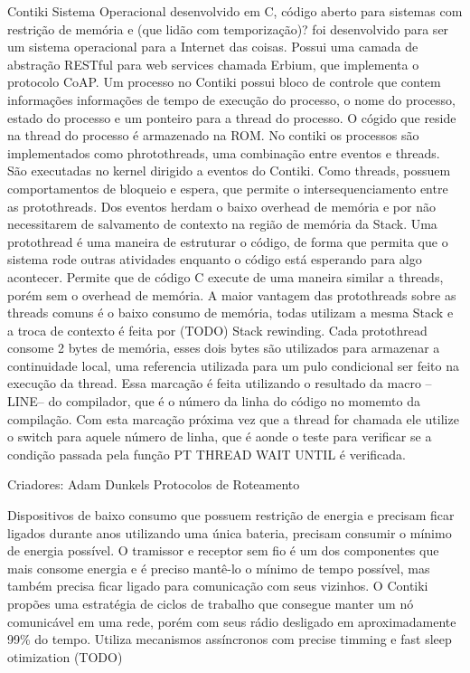 Contiki Sistema Operacional desenvolvido em C, c\'odigo aberto para sistemas com restri\c{c}\~ao de mem\'oria e (que lid\~ao com temporiza\c{c}\~ao)? foi desenvolvido para ser um sistema operacional para a Internet das coisas. Possui uma camada de abstra\c{c}\~ao RESTful para web services chamada Erbium, que implementa o protocolo CoAP.
Um processo no Contiki possui bloco de controle que contem informa\c{c}\~oes informa\c{c}\~oes de tempo de execu\c{c}\~ao do processo, o nome do processo, estado do processo e um ponteiro para a thread do processo. O c\'ogido que reside na thread do processo \'e armazenado na ROM.
No contiki os processos s\~ao implementados como phrotothreads, uma combina\c{c}\~ao entre eventos e threads. S\~ao executadas no kernel dirigido a eventos do Contiki. Como threads, possuem comportamentos de bloqueio e espera, que permite o intersequenciamento entre as protothreads. Dos eventos herdam o baixo overhead de mem\'oria e por n\~ao necessitarem de salvamento de contexto na regi\~ao de mem\'oria da Stack.
Uma protothread \'e uma maneira de estruturar o c\'odigo, de forma que permita que o sistema rode outras atividades enquanto o c\'odigo est\'a esperando para algo acontecer. Permite que de c\'odigo C execute de uma maneira similar a threads, por\'em sem o overhead de mem\'oria.
A maior vantagem das protothreads sobre as threads comuns \'e o baixo consumo de mem\'oria, todas utilizam a mesma Stack e a troca de contexto \'e feita por (TODO) Stack rewinding. Cada protothread consome 2 bytes de mem\'oria, esses dois bytes s\~ao utilizados para armazenar a continuidade local, uma referencia utilizada para um pulo condicional ser feito na execu\c{c}\~ao da thread. Essa marca\c{c}\~ao \'e feita utilizando o resultado da macro --LINE-- do compilador, que \'e o n\'umero da linha do c\'odigo no momemto da compila\c{c}\~ao. Com esta marca\c{c}\~ao pr\'oxima vez que a thread for chamada ele utilize o switch para aquele n\'umero de linha, que \'e aonde o teste para verificar se a condi\c{c}\~ao passada pela fun\c{c}\~ao PT THREAD WAIT UNTIL \'e verificada.

Criadores: Adam Dunkels
Protocolos de Roteamento

Dispositivos de baixo consumo que possuem restri\c{c}\~ao de energia e precisam ficar ligados durante anos utilizando uma \'unica bateria, precisam consumir o m\'inimo de energia poss\'ivel. O tramissor e receptor sem fio \'e um dos componentes que mais consome energia e \'e preciso mantê-lo o m\'inimo de tempo poss\'ivel, mas tamb\'em precisa ficar ligado para comunica\c{c}\~ao com seus vizinhos. O Contiki prop\~oes uma estrat\'egia de ciclos de trabalho que consegue manter um n\'o comunic\'avel em uma rede, por\'em com seus r\'adio desligado em aproximadamente 99\% do tempo. Utiliza mecanismos ass\'incronos com precise timming e fast sleep otimization (TODO)

